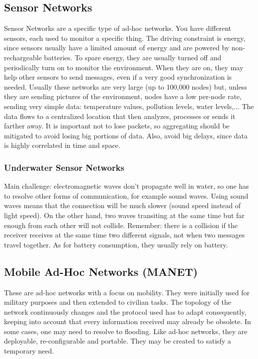 \subsection{Sensor Networks}
Sensor Networks are a specific type of ad-hoc networks. You have 
different sensors, each used to monitor a specific thing. The driving constraint 
is energy, since sensors usually have a limited amount of energy and are powered 
by non-rechargeable batteries. To spare energy, they are usually turned off and 
periodically turn on to monitor the environment. 	When they are on, they 
may help other sensors to send messages, even if a very good synchronization is
needed. 
Usually these networks are very large (up to 100,000 nodes) but, unless 
they are sending pictures of the environment, nodes have a low per-node rate, 
sending very simple data: temperature values, pollution levels, water 
levels,... 
The data flows to a centralized location that then analyzes, processes 
or sends it farther away.
It is important not to lose packets, so aggregating should be mitigated 
to avoid losing big portions of data. Also, avoid big delays, since data is 
highly correlated in time and space.

\subsubsection{Underwater Sensor Networks}
Main challenge: electromagnetic waves don't propagate well in water, so 
one has to resolve other forms of communication, for example sound waves.
Using sound waves means that the connection will be much slower (sound 
speed instead of light speed). On the other hand, two waves transiting at the
same time but far enough from each other will not collide. Remember: there is a 
collision if the receiver receives at the same time two different signals, not 
when two messages travel together.
As for battery consumption, they usually rely on battery.

\subsection{Mobile Ad-Hoc Networks (MANET)}
These are ad-hoc networks with a focus on mobility. They were initially 
used for military purposes and then extended to civilian tasks. The topology of 
the network continuously changes and the protocol used has to adapt 
consequently, keeping into account that every information received may already 
be obsolete. In some cases, one may need to resolve to flooding. Like ad-hoc 
networks, they are deployable, re-configurable and portable. They may be created 
to satisfy a temporary need.

